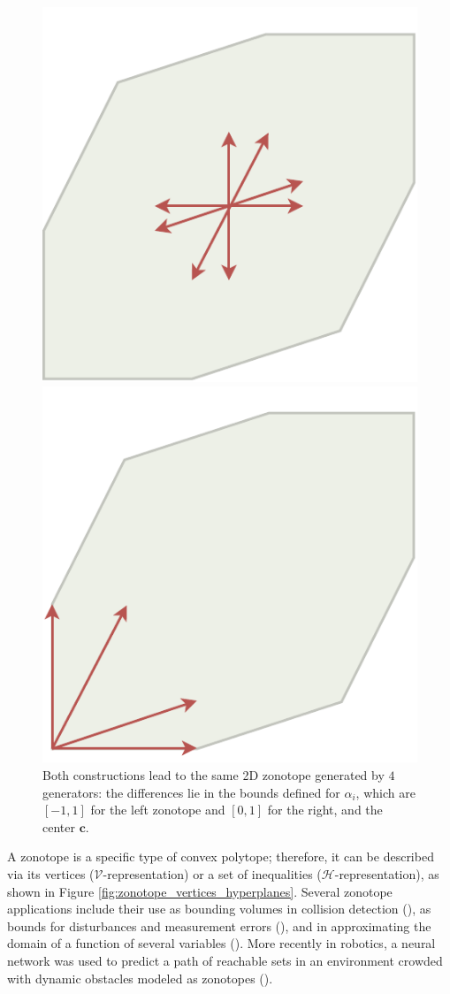 \begin{figure}[!htb]
  \captionsetup{justification=centering}
  \begin{minipage}{0.49\linewidth}
    \centering
    \includegraphics[trim={0 0 0 0},clip, width=0.6\linewidth]{img/chapter_2/zonotope_2d_4g.pdf}
  \end{minipage}
  \hfill
  \begin{minipage}{0.49\linewidth}
    \centering
    \includegraphics[trim={0 0 0 0},clip,width=0.6\linewidth]{img/chapter_2/zonotope_2d_4g_alt.pdf}
  \end{minipage}
  \caption{Both constructions lead to the same 2D zonotope generated by $4$ generators: the differences lie in the bounds defined for $\alpha_i$, which are $[-1,1]$ for the left zonotope and $[0, 1]$ for the right, and the center $\mathbf{c}$.}
  \label{fig:a_simple_zonotope}
\end{figure}

A zonotope is a specific type of convex polytope; therefore, it can be described via its vertices ($\mathcal{V}$-representation) or a set of inequalities ($\mathcal{H}$-representation), as shown in Figure \ref{fig:zonotope_vertices_hyperplanes}. Several zonotope applications include their use as bounding volumes in collision detection (\cite{guibasZonotopesBoundingVolumes}), as bounds for disturbances and measurement errors (\cite{scottInputDesignGuaranteed2014}), and in approximating the domain of a function of several variables (\cite{stinsonRandomizedAlgorithmEnumerating2016}). More recently in robotics, a neural network was used to predict a path of reachable sets in an environment crowded with dynamic obstacles modeled as zonotopes (\cite{shamsahSociallyAcceptableBipedal2024}).

